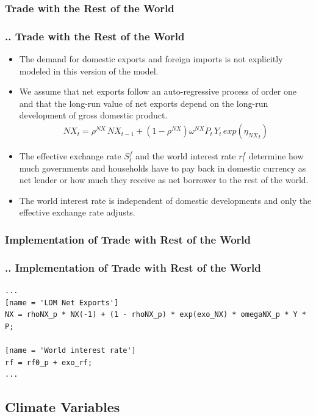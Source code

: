 \documentclass[11pt,aspectratio=169]{beamer}
\begin{document}
\subsubsection{Trade with the Rest of the World}
\begin{frame}
\frametitle{{\thesection.\thesubsection.\thesubsubsection} Trade with the Rest of the World}
\scriptsize
\begin{itemize}
\item The demand for domestic exports and foreign imports is not explicitly modeled in this version of the model. 
\item We assume that net exports follow an auto-regressive process of order one and that the long-run value of net exports depend on the long-run development of gross domestic product.
\begin{align*}
NX_{t} = \rho^{NX} \, NX_{t-1} + (1 - \rho^{NX}) \omega^{NX} P_{t} \, Y_{t} \, exp\left({{\eta_{NX}}_{t}}\right)
\end{align*}
\item The effective exchange rate $S^f_{t}$ and the world interest rate $r^{f}_{t}$ determine how much governments and households have to pay back in domestic currency as net lender or how much they receive as net borrower to the rest of the world.
 \item The world interest rate is independent of domestic developments and only the effective exchange rate adjusts.
\end{itemize}
\end{frame}

\subsubsection{Implementation of Trade with Rest of the World}
\begin{frame}[fragile]
\frametitle{{\thesection.\thesubsection.\thesubsubsection} Implementation of Trade with Rest of the World}

\begin{lstlisting}[frame = single]
...
[name = 'LOM Net Exports']
NX = rhoNX_p * NX(-1) + (1 - rhoNX_p) * exp(exo_NX) * omegaNX_p * Y * P;

[name = 'World interest rate']
rf = rf0_p + exo_rf;
...
\end{lstlisting}
\end{frame}

\subsection{Climate Variables}
\end{document}
